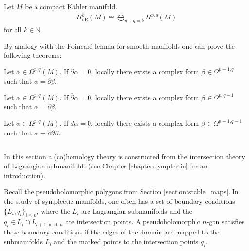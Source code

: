     \begin{theorem}
        Let $M$ be a compact K\"ahler manifold.
        \begin{gather}
            H^k_\mathrm{dR}(M)\cong\bigoplus_{p+q=k}H^{p,q}(M)
        \end{gather}
        for all $k\in\mathbb{N}$
    \end{theorem}

    By analogy with the Poincar\'e lemma for smooth manifolds one can prove the following theorems:
    \begin{theorem}
        Let $\alpha\in\Omega^{p,q}(M)$. If $\partial\alpha = 0$, locally there exists a complex form $\beta\in\Omega^{p-1,q}$ such that $\alpha = \partial\beta$.
    \end{theorem}
    \begin{theorem}
        Let $\alpha\in\Omega^{p,q}(M)$. If $\overline{\partial}\alpha = 0$, locally there exists a complex form $\beta\in\Omega^{p,q-1}$ such that $\alpha = \overline{\partial}\beta$.
    \end{theorem}
    \begin{theorem}\label{complex:del_delbar_lemma}
        Let $\alpha\in\Omega^{p,q}(M)$. If $d\alpha = 0$, locally there exists a complex form $\beta\in\Omega^{p-1,q-1}$ such that $\alpha = \partial\overline{\partial}\beta$.
    \end{theorem}

\subsection{}

    In this section a (co)homology theory is constructed from the intersection theory of Lagrangian submanifolds (see Chapter \ref{chapter:symplectic} for an introduction).

    Recall the pseudoholomorphic polygons from Section \ref{section:stable_maps}. In the study of symplectic manifolds, one often has a set of boundary conditions $\{L_i,q_i\}_{i\leq n}$, where the $L_i$ are Lagrangian submanifolds and the $q_i\in L_i\cap L_{i+1\bmod n}$ are intersection points. A pseudoholomorphic $n$-gon satisfies these boundary conditions if the edges of the domain are mapped to the submanifolds $L_i$ and the marked points to the intersection points $q_i$.

